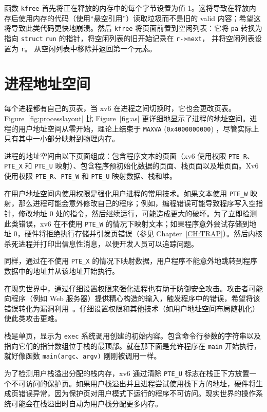 函数
\lstinline{kfree}
首先将正在释放的内存中的每个字节设置为值 1。这将导致在释放内存后使用内存的代码（使用``悬空引用''）读取垃圾而不是旧的 valid 内容；希望这将导致此类代码更快地崩溃。然后
\lstinline{kfree}
将页面前置到空闲列表：它将
\lstinline{pa}
转换为指向
\lstinline{struct}
\lstinline{run}
的指针，将空闲列表的旧开始记录在
\lstinline{r->next}，
并将空闲列表设置为
\lstinline{r}。
从空闲列表中移除并返回第一个元素。

\section{进程地址空间}

每个进程都有自己的页表，当 xv6 在进程之间切换时，它也会更改页表。
Figure~\ref{fig:processlayout} 比 Figure~\ref{fig:as} 更详细地显示了进程的地址空间。进程的用户地址空间从零开始，理论上结束于
\texttt{MAXVA}
({\tt 0x4000000000})
，尽管实际上只有其中一小部分映射到物理内存。

进程的地址空间由以下页面组成：包含程序文本的页面（xv6 使用权限 \lstinline{PTE_R}、\lstinline{PTE_X} 和 \lstinline{PTE_U} 映射）、包含程序预初始化数据的页面、栈页面以及堆页面。Xv6 使用权限 \lstinline{PTE_R}、\lstinline{PTE_W} 和 \lstinline{PTE_U} 映射数据、栈和堆。

在用户地址空间内使用权限是强化用户进程的常用技术。如果文本使用 \lstinline{PTE_W} 映射，那么进程可能会意外修改自己的程序；例如，编程错误可能导致程序写入空指针，修改地址 0 处的指令，然后继续运行，可能造成更大的破坏。为了立即检测此类错误，xv6 在不使用 \lstinline{PTE_W} 的情况下映射文本；如果程序意外尝试存储到地址 0，硬件将拒绝执行存储并引发页错误（参见 Chapter~\ref{CH:TRAP}）。然后内核杀死进程并打印出信息性消息，以便开发人员可以追踪问题。

同样，通过在不使用 \lstinline{PTE_X} 的情况下映射数据，用户程序不能意外地跳转到程序数据中的地址并从该地址开始执行。

在现实世界中，通过仔细设置权限来强化进程也有助于防御安全攻击。攻击者可能向程序（例如 Web 服务器）提供精心构造的输入，触发程序中的错误，希望将该错误转化为漏洞利用~\cite{aleph:smashing}。仔细设置权限和其他技术（如用户地址空间布局随机化）使此类攻击更难。

栈是单页，显示为 {\tt exec} 系统调用创建的初始内容。包含命令行参数的字符串以及指向它们的指针数组位于栈的最顶部。就在那下面是允许程序在
\lstinline{main}
开始执行，就好像函数 \lstinline{main(argc}、\lstinline{argv)} 刚刚被调用一样。

为了检测用户栈溢出分配的栈内存，xv6 通过清除 \lstinline{PTE_U} 标志在栈正下方放置一个不可访问的保护页。如果用户栈溢出并且进程尝试使用栈下方的地址，硬件将生成页错误异常，因为保护页对用户模式下运行的程序不可访问。现实世界的操作系统可能会在栈溢出时自动为用户栈分配更多内存。

